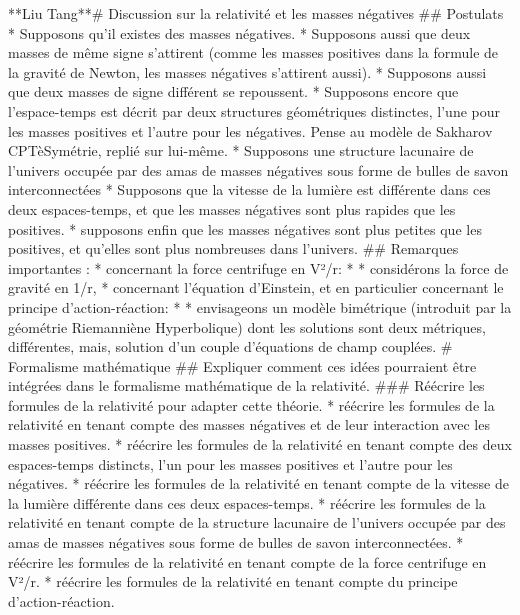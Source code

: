 \usepackage[utf8]{inputenc}
\usepackage[T1]{fontenc}
\usepackage[french]{babel}

**Liu Tang**# Discussion sur la relativité et les masses négatives
        ## Postulats
        * Supposons qu'il existes des masses négatives. 
        * Supposons aussi que deux masses de même signe s'attirent (comme les masses positives dans la formule de la gravité de Newton, les masses négatives s'attirent aussi). 
        * Supposons aussi que deux masses de signe différent se repoussent. 
        * Supposons encore que l'espace-temps est décrit par deux structures géométriques distinctes, l'une pour les masses positives et l'autre pour les négatives. 
            Pense au modèle de Sakharov CPTèSymétrie, replié sur lui-même.
        * Supposons une structure lacunaire de l’univers occupée par des amas de masses négatives sous forme de bulles de savon interconnectées
        * Supposons que la vitesse de la lumière est différente dans ces deux espaces-temps, et que les masses négatives sont plus rapides que les positives.
        * supposons enfin que les masses négatives sont plus petites que les positives, et qu'elles sont plus nombreuses dans l'univers.   
        ## Remarques importantes :
        * concernant la force centrifuge en V²/r:
        * * considérons la force de gravité en 1/r,
        * concernant l'équation d'Einstein, et en particulier concernant le principe d'action-réaction:
        * * envisageons un modèle bimétrique (introduit par la géométrie Riemanniène Hyperbolique) dont les solutions sont deux métriques, différentes, mais, solution d'un couple d'équations de champ couplées.
# Formalisme mathématique
        ## Expliquer comment ces idées pourraient être intégrées dans le formalisme mathématique de la relativité.
        ### Réécrire les formules de la relativité pour adapter cette théorie.
        * réécrire les formules de la relativité en tenant compte des masses négatives et de leur interaction avec les masses positives.
        * réécrire les formules de la relativité en tenant compte des deux espaces-temps distincts, l'un pour les masses positives et l'autre pour les négatives.
        * réécrire les formules de la relativité en tenant compte de la vitesse de la lumière différente dans ces deux espaces-temps.
        * réécrire les formules de la relativité en tenant compte de la structure lacunaire de l'univers occupée par des amas de masses négatives sous forme de bulles de savon interconnectées.
        * réécrire les formules de la relativité en tenant compte de la force centrifuge en V²/r.
        * réécrire les formules de la relativité en tenant compte du principe d'action-réaction.
